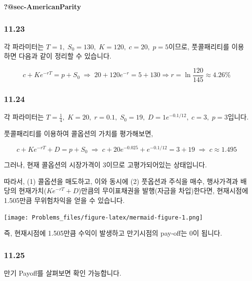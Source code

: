 \documentclass[
  letterpaper,
  DIV=11,
  numbers=noendperiod]{scrreprt}
\begin{document}
\textbf{?@sec-AmericanParity}

\subsubsection*{\texorpdfstring{\textbf{11.23}}{11.23}}\label{section-4}

각 파라미터는 \(T=1,\;S_0=130,\;K=120,\;c=20,\;p=5\)이므로, 풋콜패리티를
이용하면 다음과 같이 정리할 수 있습니다.

\[c+Ke^{-rT}=p+S_0\;\Rightarrow\;20+120e^{-r}=5+130 \Rightarrow r=\ln{\frac{120}{145}}\approx 4.26\%\]

\subsubsection*{\texorpdfstring{\textbf{11.24}}{11.24}}\label{section-5}

각 파라미터는
\(T=\frac{1}{4},\;K=20,\;r=0.1,\;S_0=19,\;D=1e^{-0.1/12},\;c=3,\;p=3\)입니다.

풋콜패리티를 이용하여 콜옵션의 가치를 평가해보면,

\[c+Ke^{-rT}+D=p+S_0\;\Rightarrow\;c+20e^{-0.025}+e^{-0.1/12}=3+19\;\Rightarrow\;c\approx 1.495\]

그러나, 현재 콜옵션의 시장가격이 3이므로 고평가되어있는 상태입니다.

따라서, (1) 콜옵션을 매도하고, 이와 동시에 (2) 풋옵션과 주식을 매수,
행사가격과 배당의 현재가치(\(Ke^{-rT}+D\))만큼의 무이표채권을
발행(자금을 차입)한다면, 현재시점에 1.505만큼 무위험차익을 얻을 수
있습니다.

\texttt{[image: Problems\_files/figure-latex/mermaid-figure-1.png]}

즉, 현재시점에 1.505만큼 수익이 발생하고 만기시점의 pay-off는 0이
됩니다.

\subsubsection*{\texorpdfstring{\textbf{11.25}}{11.25}}\label{section-6}

만기 Payoff를 살펴보면 확인 가능합니다.
\end{document}
